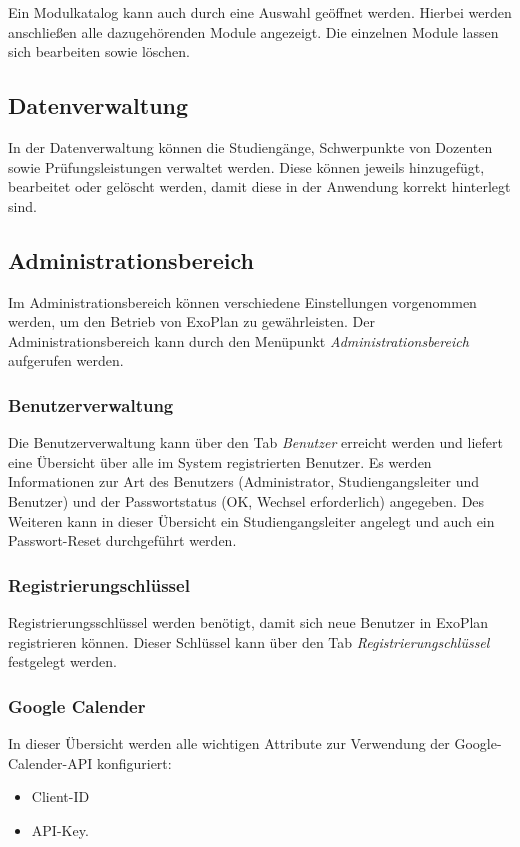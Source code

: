 Ein Modulkatalog kann auch durch eine Auswahl geöffnet werden. 
Hierbei werden anschließen alle dazugehörenden Module angezeigt. 
Die einzelnen Module lassen sich bearbeiten sowie löschen.

\subsection{Datenverwaltung}

In der Datenverwaltung können die Studiengänge, Schwerpunkte von Dozenten sowie Prüfungsleistungen verwaltet werden.
Diese können jeweils hinzugefügt, bearbeitet oder gelöscht werden, damit diese in der Anwendung korrekt hinterlegt sind.

\subsection{Administrationsbereich}

Im Administrationsbereich können verschiedene Einstellungen vorgenommen werden, um den Betrieb von ExoPlan zu gewährleisten. 
Der Administrationsbereich kann durch den Menüpunkt \textit{Administrationsbereich} aufgerufen werden.

\subsubsection{Benutzerverwaltung}

Die Benutzerverwaltung kann über den Tab \textit{Benutzer} erreicht werden und liefert eine Übersicht über alle im System registrierten Benutzer. 
Es werden Informationen zur Art des Benutzers (Administrator, Studiengangsleiter und Benutzer) und der Passwortstatus (OK, Wechsel erforderlich) angegeben. 
Des Weiteren kann in dieser Übersicht ein Studiengangsleiter angelegt und auch ein Passwort-Reset durchgeführt werden.

\subsubsection{Registrierungschlüssel}

Registrierungsschlüssel werden benötigt, damit sich neue Benutzer in ExoPlan registrieren können. 
Dieser Schlüssel kann über den Tab \textit{Registrierungschlüssel} festgelegt werden.

\subsubsection{Google Calender}

In dieser Übersicht werden alle wichtigen Attribute zur Verwendung der Google-Calender-\ac{API} konfiguriert:
\begin{itemize}
	\item Client-ID
	\item \ac{API}-Key.
\end{itemize}
